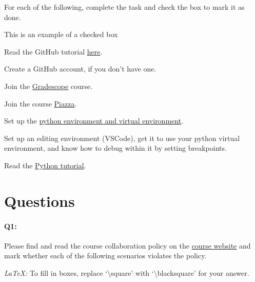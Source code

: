\documentclass[11pt]{article}
\newcommand{\cmark}{\ding{51}}%
\newcommand{\done}{\rlap{$\square$}{\raisebox{2pt}{\large\hspace{1pt}\cmark}}%
\hspace{-2.5pt}}
\begin{document}
For each of the following, complete the task and check the box to mark it as done.
\begin{todolist}
    \item[\done] This is an example of a checked box
    \item[\done] Read the GitHub tutorial \href{https://browncsci1430.github.io/webpage/resources/github_guide/}{here}.
    \item[\done] Create a GitHub account, if you don't have one.
    \item[\done] Join the \href{https://www.gradescope.com/}{Gradescope} course.
    \item[\done] Join the course \href{https://piazza.com/}{Piazza}.
    \item[\done] Set up the \href{https://browncsci1430.github.io/webpage/resources/python_setup/}{python environment and virtual environment}.
    \item[\done] Set up an editing environment (VSCode), get it to use your python virtual environment, and know how to debug within it by setting breakpoints.
    \item[\done] Read the \href{https://browncsci1430.github.io/webpage/resources/python_tutorial/}{Python tutorial}.
\end{todolist}

\section*{Questions}

\paragraph{Q1:} Please find and read the course collaboration policy on the \href{http://cs.brown.edu/courses/csci1430/}{course website} and mark whether each of the following scenarios violates the policy.

\emph{LaTeX:} To fill in boxes, replace `\textbackslash square' with `\textbackslash blacksquare' for your answer.
\end{document}

